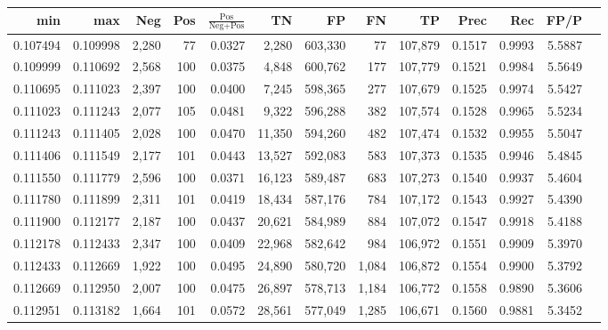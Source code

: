 \begin{tabular}{rrrrrrrrrrrrr}
\toprule
     min &      max &   Neg & Pos & $\frac{\text{Pos}}{\text{Neg}+\text{Pos}}$ &      TN &      FP &      FN &      TP &   Prec &    Rec &   FP/P \\
\midrule
0.107494 & 0.109998 & 2,280 &  77 &                                     0.0327 &   2,280 & 603,330 &      77 & 107,879 & 0.1517 & 0.9993 & 5.5887 \\
0.109999 & 0.110692 & 2,568 & 100 &                                     0.0375 &   4,848 & 600,762 &     177 & 107,779 & 0.1521 & 0.9984 & 5.5649 \\
0.110695 & 0.111023 & 2,397 & 100 &                                     0.0400 &   7,245 & 598,365 &     277 & 107,679 & 0.1525 & 0.9974 & 5.5427 \\
0.111023 & 0.111243 & 2,077 & 105 &                                     0.0481 &   9,322 & 596,288 &     382 & 107,574 & 0.1528 & 0.9965 & 5.5234 \\
0.111243 & 0.111405 & 2,028 & 100 &                                     0.0470 &  11,350 & 594,260 &     482 & 107,474 & 0.1532 & 0.9955 & 5.5047 \\
0.111406 & 0.111549 & 2,177 & 101 &                                     0.0443 &  13,527 & 592,083 &     583 & 107,373 & 0.1535 & 0.9946 & 5.4845 \\
0.111550 & 0.111779 & 2,596 & 100 &                                     0.0371 &  16,123 & 589,487 &     683 & 107,273 & 0.1540 & 0.9937 & 5.4604 \\
0.111780 & 0.111899 & 2,311 & 101 &                                     0.0419 &  18,434 & 587,176 &     784 & 107,172 & 0.1543 & 0.9927 & 5.4390 \\
0.111900 & 0.112177 & 2,187 & 100 &                                     0.0437 &  20,621 & 584,989 &     884 & 107,072 & 0.1547 & 0.9918 & 5.4188 \\
0.112178 & 0.112433 & 2,347 & 100 &                                     0.0409 &  22,968 & 582,642 &     984 & 106,972 & 0.1551 & 0.9909 & 5.3970 \\
0.112433 & 0.112669 & 1,922 & 100 &                                     0.0495 &  24,890 & 580,720 &   1,084 & 106,872 & 0.1554 & 0.9900 & 5.3792 \\
0.112669 & 0.112950 & 2,007 & 100 &                                     0.0475 &  26,897 & 578,713 &   1,184 & 106,772 & 0.1558 & 0.9890 & 5.3606 \\
0.112951 & 0.113182 & 1,664 & 101 &                                     0.0572 &  28,561 & 577,049 &   1,285 & 106,671 & 0.1560 & 0.9881 & 5.3452 \\

\end{tabular}
